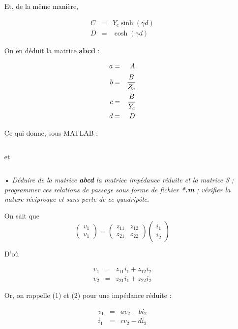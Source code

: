 \documentclass[10pt]{article}
\begin{document}
\begin{itemize}
        Et, de la même manière,

        \begin{eqnarray}
            C &=& Y_c \sinh(\gamma d) \\
            D &=& \cosh(\gamma d)
        \end{eqnarray}

        On en déduit la matrice \textbf{abcd} :

        \begin{eqnarray}
            a &=& A \\
            b &=& \cfrac{B}{Z_c} \\
            c &=& \cfrac{B}{Y_c} \\
            d &=& D
        \end{eqnarray}

        Ce qui donne, sous MATLAB :
        \inputminted[linenos]{matlab}{src/M.m}
        et
        \inputminted[linenos]{matlab}{src/m_normalise.m}

    \item[•] \textit{Déduire de la matrice \textbf{abcd} la matrice impédance réduite et la matrice S ; programmer ces relations de passage sous forme de fichier \textbf{*.m} ; vérifier la nature réciproque et sans perte de ce quadripôle.}

        On sait que
        \[
            \begin{pmatrix}
                v_1 \\
                v_1
            \end{pmatrix}
            =
            \begin{pmatrix}
                z_{11} & z_{12} \\
                z_{21} & z_{22}
            \end{pmatrix}
            \begin{pmatrix}
                i_1 \\
                i_2
            \end{pmatrix}
        \]

        D'où

        \begin{eqnarray}
            v_1 &=& z_{11} i_1 + z_{12} i_2 \\
            v_2 &=& z_{21} i_1 + z_{22} i_2
        \end{eqnarray}

        Or, on rappelle (1) et (2) pour une impédance réduite :

        \begin{eqnarray}
            v_1 &=& a v_2 - b i_2 \\
            i_1 &=& c v_2 - d i_2
        \end{eqnarray}


\end{itemize}
\end{document}
